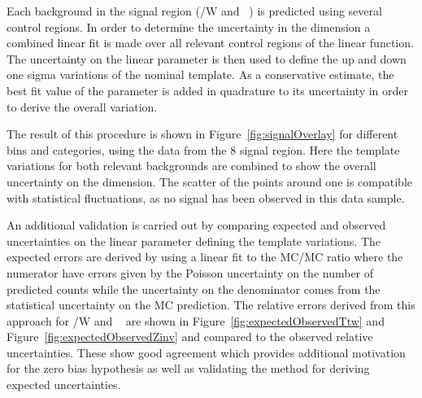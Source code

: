 Each background in the signal region (\ttbar/W  and \zInv~) is predicted 
using several control regions. In order to determine the uncertainty in
the \mht dimension a combined linear fit is made over all relevant control regions
of the linear function. The uncertainty on the linear parameter is then
used to define the up and down one sigma variations of the nominal template.
As a conservative estimate, the best fit value of the parameter is 
added in quadrature to its uncertainty in order to derive the overall variation.

The result of this procedure is shown in Figure~\ref{fig:signalOverlay} for different 
\scalht bins and categories, using the data from the 8 \TeV signal region. 
Here the template variations for both relevant backgrounds are combined to show 
the overall uncertainty on the \mht dimension. The scatter of the points around 
one is compatible with statistical fluctuations, 
as no signal has been observed in this data sample.

An additional validation is carried out by comparing expected and observed uncertainties
on the linear parameter defining the template variations.
The expected errors are derived by using a linear fit to the MC/MC ratio where the numerator
have errors given by the Poisson uncertainty on the number of predicted counts while
the uncertainty on the denominator comes from the statistical uncertainty on the
MC prediction. The relative errors derived from this approach for \ttbar/W and \zInv~ are shown in 
Figure~\ref{fig:expectedObservedTtw} and Figure~\ref{fig:expectedObservedZinv} 
and compared to the observed relative uncertainties. These show good agreement 
which provides additional motivation for the zero bias hypothesis as
well as validating the method for deriving expected uncertainties.


